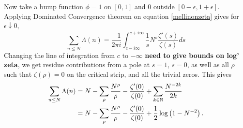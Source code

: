 Now take a bump function $\phi=1$ on $[0,1]$ and $0$ outside $[0-\epsilon, 1+\epsilon]$. 
Applying Dominated Convergence theorem on equation \ref{mellinonzeta} gives for $\epsilon \downarrow 0$,
\begin{equation}\label{preexplicit}
    \sum_{n\leq N} \Lambda(n)=
    \frac{-1}{2\pi i}\int_{c-i\infty}^{c+i\infty}
    \frac{1}{s} N^s \frac{\zeta'(s)}{\zeta(s)} ds
\end{equation}
Changing the line of integration from $c$ to $-\infty$ \textbf{need to give bounds on log' zeta}, we get residue contributions from
a pole at $s=1$, $s=0$, as well as all $\rho$ such that $\zeta(\rho)=0$ on the critical strip,
and all the trivial zeros. This gives \begin{equation}
    \begin{split}
        \sum_{n\leq N} \Lambda(n)&= N - \sum_{\rho} \frac{N^\rho}{\rho} -
        \frac{\zeta'(0)}{\zeta(0)} + \sum_{k\in\mathbb{N}}\frac{N^{-2k}}{2k} \\
        &= N - \sum_{\rho} \frac{N^\rho}{\rho} -
        \frac{\zeta'(0)}{\zeta(0)} + \frac{1}{2}\log\left(1-N^{-2}\right). 
    \end{split}
\end{equation}
